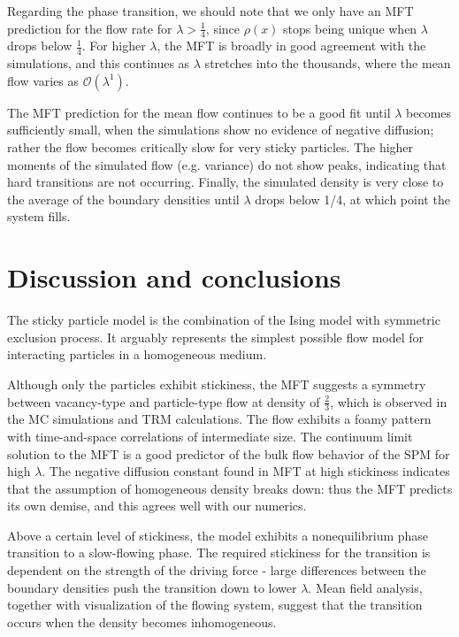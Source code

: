 \documentclass[
reprint, amsmath,amssymb,
]{revtex4-1}
\begin{document}
Regarding the phase transition, we should note that we only have an
MFT prediction for the flow rate for $\lambda>\frac{1}{4}$, since
$\rho(x)$ stops being unique when $\lambda$ drops below $\frac{1}{4}$. For higher $\lambda$, the MFT is broadly in good agreement with the
simulations, and this continues as $\lambda$ stretches into the
thousands, where the mean flow varies as $\mathcal{O}(\lambda^1)$.


The MFT prediction for the mean flow continues to be a good fit until $\lambda$ becomes sufficiently small,
when the simulations show no evidence of negative diffusion; rather the flow becomes critically slow for very sticky particles.
The higher moments of the simulated flow (e.g. variance) do not show peaks, indicating that hard transitions are not occurring.
Finally, the  simulated density is very close to the average of the boundary densities until $\lambda$ drops below 1/4, at which point the system fills.







\section{Discussion and conclusions}

The sticky particle model is the combination of the Ising model with
symmetric exclusion process.  It arguably represents the simplest
possible flow model for interacting particles in a homogeneous medium.

Although only the particles exhibit
stickiness, the MFT suggests a symmetry between vacancy-type and
particle-type flow at density of $\frac{2}{3}$, which is observed in
the MC simulations and TRM calculations.  The flow exhibits a foamy pattern with time-and-space correlations of intermediate size.  The continuum limit solution to the MFT is a good
predictor of the bulk flow behavior of the SPM for high $\lambda$.  The negative
diffusion constant found in MFT at high stickiness indicates that the
assumption of homogeneous density breaks down: thus the MFT predicts
its own demise, and this agrees well with our numerics.

Above a certain level of stickiness, the model exhibits a
nonequilibrium phase transition to a slow-flowing phase.  The required
stickiness for the transition is dependent on the strength of the
driving force - large differences between the boundary densities push the transition down to lower $\lambda$.  Mean field
analysis, together with visualization of the flowing system, suggest
that the transition occurs when the density becomes inhomogeneous.
\end{document}
